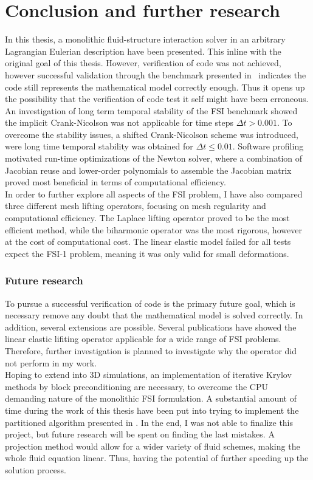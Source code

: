 \chapter{Conclusion and further research}

In this thesis, a monolithic fluid-structure interaction solver in an arbitrary Lagrangian Eulerian description have been presented. This inline with the original goal of this thesis. However, verification of code was not achieved, however successful validation through the benchmark presented in~\cite{Hron2006} indicates the code still represents the mathematical model correctly enough. Thus it opens up the possibility that the verification of code test it self might have been erroneous. \\

An investigation of long term temporal stability of the FSI benchmark showed the implicit Crank-Nicolson was not applicable for time steps  $\Delta t > 0.001$. To overcome the stability issues, a shifted Crank-Nicolson scheme was introduced, were long time temporal stability was obtained for $\Delta t \leq 0.01$. Software profiling motivated run-time optimizations of the Newton solver, where a combination of Jacobian reuse and lower-order polynomials to assemble the Jacobian matrix proved most beneficial in terms of computational efficiency.  \\

In order to further explore all aspects of the FSI problem, I have also compared three different mesh lifting operators, focusing on mesh regularity and computational efficiency. The Laplace lifting operator proved to be the most efficient method, while the biharmonic operator was the most rigorous, however at the cost of computational cost. The linear elastic model failed for all tests expect the FSI-1 problem, meaning it was only valid for small deformations. 

\newpage
\subsection*{Future research}
To pursue a successful verification of code is the primary future goal, which is necessary remove any doubt that the mathematical model is solved correctly. In addition, several extensions are possible. Several publications have showed the linear elastic lifiting operator applicable for a wide range of FSI problems. Therefore, further investigation is planned to investigate why the operator did not perform in my work.  \\

Hoping to extend into 3D simulations, an implementation of iterative Krylov methods by block preconditioning are necessary, to overcome the CPU demanding nature of the monolithic FSI formulation. A substantial amount of time during the work of this thesis have been put into trying to implement the partitioned algorithm presented in \cite{Fernandez2007}. In the end, I was not able to finalize this project, but future research will be spent on finding the last mistakes. A projection method would allow for a wider variety of fluid schemes, making the whole fluid equation linear. Thus, having the potential of further speeding up the solution process.
